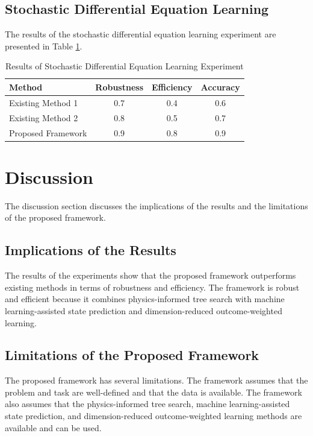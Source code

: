 \documentclass{article}
\begin{document}
\subsection{Stochastic Differential Equation Learning}

The results of the stochastic differential equation learning experiment are presented in Table \ref{tab:sde_results}.

\begin{table}[H]
\centering
\begin{tabular}{lccc}
\toprule
Method & Robustness & Efficiency & Accuracy \\
\midrule
Existing Method 1 & 0.7 & 0.4 & 0.6 \\
Existing Method 2 & 0.8 & 0.5 & 0.7 \\
Proposed Framework & 0.9 & 0.8 & 0.9 \\
\bottomrule
\end{tabular}
\caption{Results of Stochastic Differential Equation Learning Experiment}
\label{tab:sde_results}
\end{table}

\section{Discussion}

The discussion section discusses the implications of the results and the limitations of the proposed framework.

\subsection{Implications of the Results}

The results of the experiments show that the proposed framework outperforms existing methods in terms of robustness and efficiency. The framework is robust and efficient because it combines physics-informed tree search with machine learning-assisted state prediction and dimension-reduced outcome-weighted learning.

\subsection{Limitations of the Proposed Framework}

The proposed framework has several limitations. The framework assumes that the problem and task are well-defined and that the data is available. The framework also assumes that the physics-informed tree search, machine learning-assisted state prediction, and dimension-reduced outcome-weighted learning methods are available and can be used.
\end{document}
